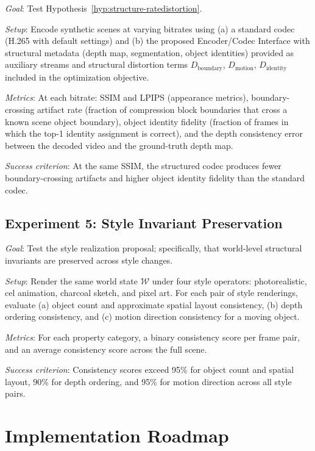 \documentclass[12pt,a4paper]{article}
\theoremstyle{plain}
\theoremstyle{definition}
\theoremstyle{remark}
\begin{document}
\textit{Goal}: Test Hypothesis~\ref{hyp:structure-ratedistortion}.

\textit{Setup}: Encode synthetic scenes at varying bitrates using (a) a standard codec (H.265 with default settings) and (b) the proposed Encoder/Codec Interface with structural metadata (depth map, segmentation, object identities) provided as auxiliary streams and structural distortion terms $D_{\mathrm{boundary}}$, $D_{\mathrm{motion}}$, $D_{\mathrm{identity}}$ included in the optimization objective.

\textit{Metrics}: At each bitrate: SSIM and LPIPS (appearance metrics), boundary-crossing artifact rate (fraction of compression block boundaries that cross a known scene object boundary), object identity fidelity (fraction of frames in which the top-1 identity assignment is correct), and the depth consistency error between the decoded video and the ground-truth depth map.

\textit{Success criterion}: At the same SSIM, the structured codec produces fewer boundary-crossing artifacts and higher object identity fidelity than the standard codec.

\subsection{Experiment 5: Style Invariant Preservation}

\textit{Goal}: Test the style realization proposal; specifically, that world-level structural invariants are preserved across style changes.

\textit{Setup}: Render the same world state $\mathcal{W}$ under four style operators: photorealistic, cel animation, charcoal sketch, and pixel art. For each pair of style renderings, evaluate (a) object count and approximate spatial layout consistency, (b) depth ordering consistency, and (c) motion direction consistency for a moving object.

\textit{Metrics}: For each property category, a binary consistency score per frame pair, and an average consistency score across the full scene.

\textit{Success criterion}: Consistency scores exceed 95\% for object count and spatial layout, 90\% for depth ordering, and 95\% for motion direction across all style pairs.

\section{Implementation Roadmap}
\label{sec:implementation}
\end{document}
